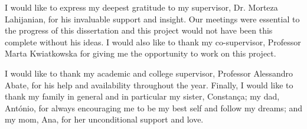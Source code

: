 \begin{acknowledgements}
I would like to express my deepest gratitude to my supervisor, Dr. Morteza Lahijanian, for his invaluable support and insight. Our meetings were essential to the progress of this dissertation and this project would not have been this complete without his ideas. I would also like to thank my co-supervisor, Professor Marta Kwiatkowska for giving me the opportunity to work on this project. 

I would like to thank my academic and college supervisor, Professor Alessandro Abate, for his help and availability throughout the year. Finally, I would like to thank my family in general and in particular my sister, Constança; my dad, António, for always encouraging me to be my best self and follow my dreams; and my mom, Ana, for her unconditional support and love.
\end{acknowledgements}